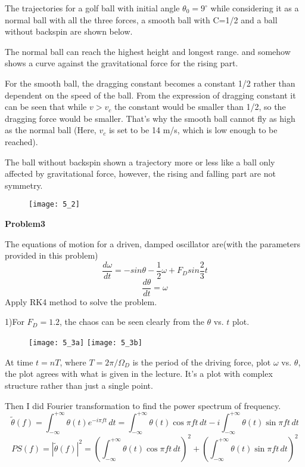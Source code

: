 \documentclass{article}
\begin{document}
\vspace{0.5cm}
The trajectories for a golf ball with initial angle $\theta_0=9^\circ$ while considering it as a normal ball with all the three forces, a smooth ball with C=1/2 and a ball without backspin are shown below.  

The normal ball can reach the highest height and longest range. and somehow shows a curve against the gravitational force for the rising part.  

For the smooth ball, the dragging constant becomes a constant 1/2 rather than dependent on the speed of the ball.  From the expression of dragging constant it can be seen that while $v>v_c$ the constant would be smaller than 1/2, so the dragging force would be smaller.  That's why the smooth ball cannot fly as high as the normal ball (Here, $v_c$ is set to be 14 m/s, which is low enough to be reached).  

The ball without backspin shown a trajectory more or less like a ball only affected by gravitational force, however, the rising and falling part are not symmetry.

\begin{figure} [ht]
\texttt{[image: 5\_2]}
\end{figure}
\vskip 1cm



\textbf{Problem3}

The equations of motion for a driven, damped oscillator are(with the parameters provided in this problem)
\[\frac{d\omega}{dt}=-sin\theta-\frac{1}{2}\omega+F_Dsin\frac{2}{3}t\] 
\[\frac{d\theta}{dt}=\omega\]
Apply RK4 method to solve the problem.

\vspace{0.5cm}

1)For $F_D=1.2$, the chaos can be seen clearly from the $\theta$ vs. $t$ plot.
\begin{figure} [ht]
\texttt{[image: 5\_3a]}
\texttt{[image: 5\_3b]}
\end{figure}

At time $t=nT$, where $T=2\pi/\Omega_D$ is the period of the driving force, plot $\omega$ vs. $\theta$, the plot agrees with what is given in the lecture.  It's a plot with complex structure rather than just a single point.

Then I did Fourier transformation to find the power spectrum of frequency.
 \[\tilde{\theta}(f) = \displaystyle \int_{-\infty}^{+\infty} \theta(t)e^{-i \pi f t}\, dt={\int_{-\infty}^{+\infty}} \theta(t)\cos{\pi f t \, dt} -i {\int_{-\infty}^{+\infty}} \theta(t)\sin{\pi f t \, dt}\]
 \[PS(f)=|\tilde{\theta}(f)|^2= \left({\int_{-\infty}^{+\infty}} \theta(t)\cos{\pi f t \, dt}\right)^2 + \left({\int_{-\infty}^{+\infty}} \theta(t)\sin{\pi f t \, dt}\right)^2\]
 
\end{document}

